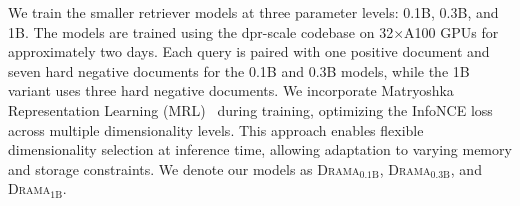 \documentclass[]{fairmeta}
\newcommand{\ourmodel}{\textsc{Drama}}
\begin{document}
We train the smaller retriever models at three parameter levels: 0.1B, 0.3B, and 1B.
The models are trained using the dpr-scale codebase on 32$\times$A100 GPUs for approximately two days.
Each query is paired with one positive document and seven hard negative documents for the 0.1B and 0.3B models, while the 1B variant uses three hard negative documents.
We incorporate Matryoshka Representation Learning (MRL)~\citep{kusupati2022matryoshka} during training, optimizing the InfoNCE loss across multiple dimensionality levels. This approach enables flexible dimensionality selection at inference time, allowing adaptation to varying memory and storage constraints.
We denote our models as \ourmodel{}$_\text{0.1B}$, \ourmodel{}$_\text{0.3B}$, and \ourmodel{}$_\text{1B}$.
\end{document}
